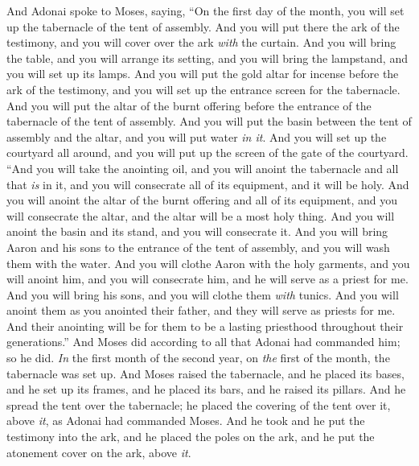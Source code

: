 \begin{biblechapter} %
 And Adonai spoke to Moses, saying,
\verse “On the first day of the month, you will set up the tabernacle of the tent of assembly.
\verse And you will put there the ark of the testimony, and you will cover over the ark \textit{with} the curtain.
\verse And you will bring the table, and you will arrange its setting, and you will bring the lampstand, and you will set up its lamps.
\verse And you will put the gold altar for incense before the ark of the testimony, and you will set up the entrance screen for the tabernacle.
\verse And you will put the altar of the burnt offering before the entrance of the tabernacle of the tent of assembly.
\verse And you will put the basin between the tent of assembly and the altar, and you will put water \textit{in it}.
\verse And you will set up the courtyard all around, and you will put up the screen of the gate of the courtyard.
\verse “And you will take the anointing oil, and you will anoint the tabernacle and all that \textit{is} in it, and you will consecrate all of its equipment, and it will be holy.
\verse And you will anoint the altar of the burnt offering and all of its equipment, and you will consecrate the altar, and the altar will be a most holy thing.
\verse And you will anoint the basin and its stand, and you will consecrate it.
\verse And you will bring Aaron and his sons to the entrance of the tent of assembly, and you will wash them with the water.
\verse And you will clothe Aaron with the holy garments, and you will anoint him, and you will consecrate him, and he will serve as a priest for me.
\verse And you will bring his sons, and you will clothe them \textit{with} tunics.
\verse And you will anoint them as you anointed their father, and they will serve as priests for me. And their anointing will be for them to be a lasting priesthood throughout their generations.”
\verse And Moses did according to all that Adonai had commanded him; so he did.
\verse \textit{In} the first month of the second year, on \textit{the} first of the month, the tabernacle was set up.
\verse And Moses raised the tabernacle, and he placed its bases, and he set up its frames, and he placed its bars, and he raised its pillars.
\verse And he spread the tent over the tabernacle; he placed the covering of the tent over it, above \textit{it}, as Adonai had commanded Moses.
\verse And he took and he put the testimony into the ark, and he placed the poles on the ark, and he put the atonement cover on the ark, above \textit{it}.

\end{biblechapter}
